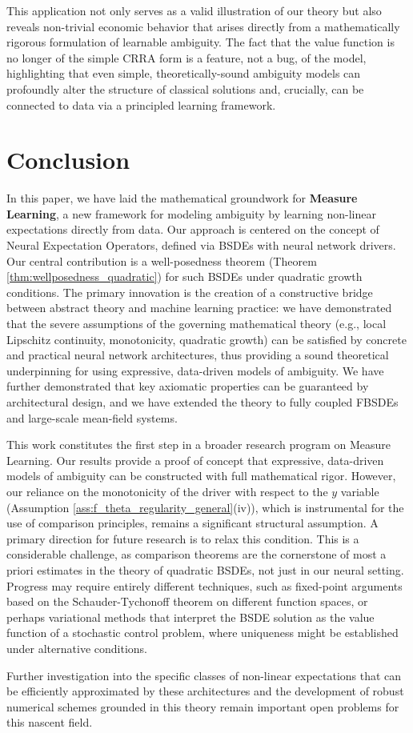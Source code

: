 \documentclass[qian]{imsart}
\theoremstyle{plain}
\theoremstyle{definition}
\begin{document}
This application not only serves as a valid illustration of our theory but also reveals non-trivial economic behavior that arises directly from a mathematically rigorous formulation of learnable ambiguity. The fact that the value function is no longer of the simple CRRA form is a feature, not a bug, of the model, highlighting that even simple, theoretically-sound ambiguity models can profoundly alter the structure of classical solutions and, crucially, can be connected to data via a principled learning framework.
\section{Conclusion}
\label{sec:conclusion}

In this paper, we have laid the mathematical groundwork for \textbf{Measure Learning}, a new framework for modeling ambiguity by learning non-linear expectations directly from data. Our approach is centered on the concept of Neural Expectation Operators, defined via BSDEs with neural network drivers. Our central contribution is a well-posedness theorem (Theorem \ref{thm:wellposedness_quadratic}) for such BSDEs under quadratic growth conditions. The primary innovation is the creation of a constructive bridge between abstract theory and machine learning practice: we have demonstrated that the severe assumptions of the governing mathematical theory (e.g., local Lipschitz continuity, monotonicity, quadratic growth) can be satisfied by concrete and practical neural network architectures, thus providing a sound theoretical underpinning for using expressive, data-driven models of ambiguity. We have further demonstrated that key axiomatic properties can be guaranteed by architectural design, and we have extended the theory to fully coupled FBSDEs and large-scale mean-field systems.

This work constitutes the first step in a broader research program on Measure Learning. Our results provide a proof of concept that expressive, data-driven models of ambiguity can be constructed with full mathematical rigor. However, our reliance on the monotonicity of the driver with respect to the $y$ variable (Assumption \ref{ass:f_theta_regularity_general}(iv)), which is instrumental for the use of comparison principles, remains a significant structural assumption. A primary direction for future research is to relax this condition. This is a considerable challenge, as comparison theorems are the cornerstone of most a priori estimates in the theory of quadratic BSDEs, not just in our neural setting. Progress may require entirely different techniques, such as fixed-point arguments based on the Schauder-Tychonoff theorem on different function spaces, or perhaps variational methods that interpret the BSDE solution as the value function of a stochastic control problem, where uniqueness might be established under alternative conditions.

Further investigation into the specific classes of non-linear expectations that can be efficiently approximated by these architectures and the development of robust numerical schemes grounded in this theory remain important open problems for this nascent field.


 
\end{document}
